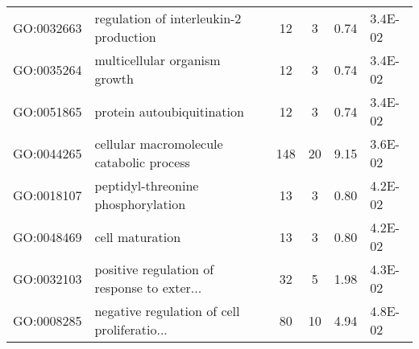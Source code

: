 \begin{table}[ht]
\begin{tabular}{llcccl}
  GO:0032663 & regulation of interleukin-2 production &  12 &   3 & 0.74 & 3.4E-02 \\ 
  GO:0035264 & multicellular organism growth &  12 &   3 & 0.74 & 3.4E-02 \\ 
  GO:0051865 & protein autoubiquitination &  12 &   3 & 0.74 & 3.4E-02 \\ 
  GO:0044265 & cellular macromolecule catabolic process & 148 &  20 & 9.15 & 3.6E-02 \\ 
  GO:0018107 & peptidyl-threonine phosphorylation &  13 &   3 & 0.80 & 4.2E-02 \\ 
  GO:0048469 & cell maturation &  13 &   3 & 0.80 & 4.2E-02 \\ 
  GO:0032103 & positive regulation of response to exter... &  32 &   5 & 1.98 & 4.3E-02 \\ 
  GO:0008285 & negative regulation of cell proliferatio... &  80 &  10 & 4.94 & 4.8E-02 \\ 
   \hline
\end{tabular}
\label{P-value, LFC > 1.4, Negative}
\end{table}

